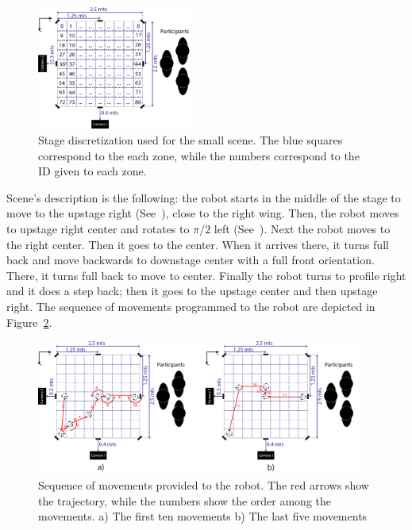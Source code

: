 \begin{figure}
	\centering
	\includegraphics[width=0.45\textwidth]{./Images/FourthCaseScene.png} 
	\caption{Stage discretization  used for the small scene. The blue squares correspond to the each zone, while the numbers correspond to the ID given to each zone.}
	\label{fig:stage_division}
\end{figure} 

Scene's description is the following: the robot starts in the middle of the stage to move to the upstage right (See~\cite{Musical}), close to the right wing. Then, the robot moves to upstage right center and rotates to $\pi/2$ left (See~\cite{Artopia}). Next the robot moves to the right center. Then it goes to the center. When it arrives there, it turns full back and move backwards to downstage center with a full front orientation. There, it turns full back to move to center. Finally the robot turns to profile right and it does a step back; then it goes to the upstage center and then upstage right. The sequence of movements programmed to the robot are depicted in Figure~\ref{fig:movement}.
\begin{figure}
	\centering
	\includegraphics[width=0.95\textwidth]{./Images/fourthCaseSceneD.png} 
	\caption{Sequence of movements provided to the robot. The red arrows show the trajectory, while the numbers show the order among the movements. a) The first ten movements b) The last five movements }
	\label{fig:movement}
\end{figure}

